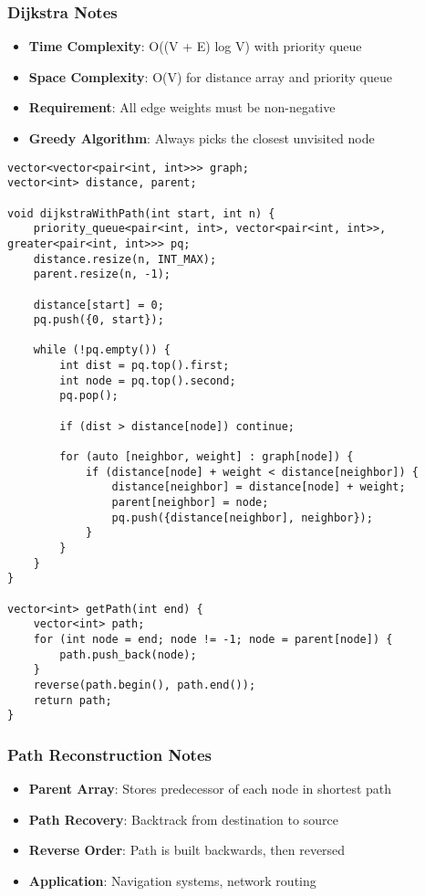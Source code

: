 \documentclass[11pt,a4paper]{article}
\begin{document}
\subsubsection{Dijkstra Notes}
\begin{itemize}
\item \textbf{Time Complexity}: O((V + E) log V) with priority queue
\item \textbf{Space Complexity}: O(V) for distance array and priority queue
\item \textbf{Requirement}: All edge weights must be non-negative
\item \textbf{Greedy Algorithm}: Always picks the closest unvisited node
\end{itemize}

\newpage
\begin{lstlisting}[caption={Dijkstra with Path Reconstruction}]
vector<vector<pair<int, int>>> graph;
vector<int> distance, parent;

void dijkstraWithPath(int start, int n) {
    priority_queue<pair<int, int>, vector<pair<int, int>>, greater<pair<int, int>>> pq;
    distance.resize(n, INT_MAX);
    parent.resize(n, -1);
    
    distance[start] = 0;
    pq.push({0, start});
    
    while (!pq.empty()) {
        int dist = pq.top().first;
        int node = pq.top().second;
        pq.pop();
        
        if (dist > distance[node]) continue;
        
        for (auto [neighbor, weight] : graph[node]) {
            if (distance[node] + weight < distance[neighbor]) {
                distance[neighbor] = distance[node] + weight;
                parent[neighbor] = node;
                pq.push({distance[neighbor], neighbor});
            }
        }
    }
}

vector<int> getPath(int end) {
    vector<int> path;
    for (int node = end; node != -1; node = parent[node]) {
        path.push_back(node);
    }
    reverse(path.begin(), path.end());
    return path;
}
\end{lstlisting}

\subsubsection{Path Reconstruction Notes}
\begin{itemize}
\item \textbf{Parent Array}: Stores predecessor of each node in shortest path
\item \textbf{Path Recovery}: Backtrack from destination to source
\item \textbf{Reverse Order}: Path is built backwards, then reversed
\item \textbf{Application}: Navigation systems, network routing
\end{itemize}
\end{document}
